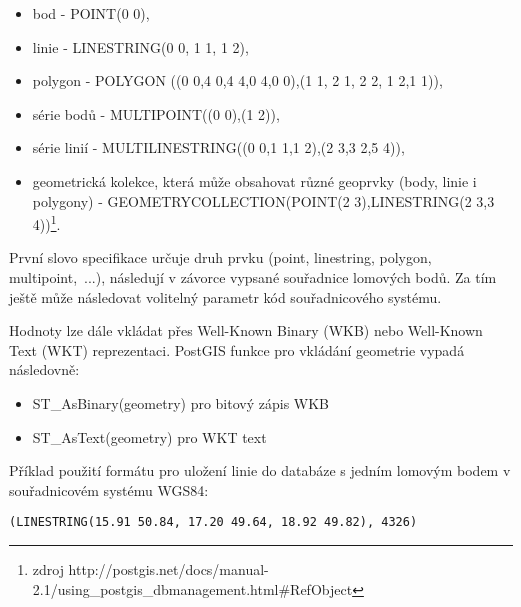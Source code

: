         \begin{itemize}
          \item bod - POINT(0 0),
          \item linie - LINESTRING(0 0, 1 1, 1 2),
          \item polygon - POLYGON ((0 0,4 0,4 4,0 4,0 0),(1 1, 2 1, 2 2, 1 2,1 1)),
          \item série bodů - MULTIPOINT((0 0),(1 2)),
          \item série linií - MULTILINESTRING((0 0,1 1,1 2),(2 3,3 2,5 4)),
          \item geometrická kolekce, která může obsahovat různé geoprvky (body, linie i polygony) - GEOMETRYCOLLECTION(POINT(2 3),LINESTRING(2 3,3 4))\footnote{zdroj http://postgis.net/docs/manual-2.1/using\_postgis\_dbmanagement.html\#RefObject}.
        \end{itemize}

První slovo specifikace určuje druh prvku (point, linestring, polygon, multipoint,~...), následují v závorce vypsané souřadnice lomových bodů. Za tím ještě může následovat volitelný parametr kód souřadnicového systému.

Hodnoty lze dále vkládat přes Well-Known Binary (WKB) nebo Well-Known Text (WKT) reprezentaci. PostGIS funkce pro vkládání geometrie vypadá následovně:

        \begin{itemize}
          \item ST\_AsBinary(geometry) pro bitový zápis WKB
          \item ST\_AsText(geometry) pro WKT text
        \end{itemize}

Příklad použití formátu pro uložení linie do databáze s jedním lomovým bodem v souřadnicovém systému WGS84:

        \texttt{(LINESTRING(15.91 50.84, 17.20 49.64, 18.92 49.82), 4326)}
